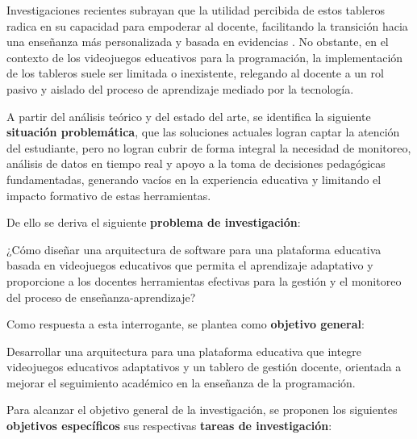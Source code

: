 Investigaciones recientes subrayan que la utilidad percibida de estos tableros radica en su capacidad para empoderar al docente, facilitando la transición hacia una enseñanza más personalizada y basada en evidencias \cite{rets_exploring_2021, ilearn2023dashboards}. No obstante, en el contexto de los videojuegos educativos para la programación, la implementación de los tableros suele ser limitada o inexistente, relegando al docente a un rol pasivo y aislado del proceso de aprendizaje mediado por la tecnología.

A partir del análisis teórico y del estado del arte, se identifica la siguiente \textbf{situación problemática}, que las soluciones actuales logran captar la atención del estudiante, pero no logran cubrir de forma integral la necesidad de monitoreo, análisis de datos en tiempo real y apoyo a la toma de decisiones pedagógicas fundamentadas, generando vacíos en la experiencia educativa y limitando el impacto formativo de estas herramientas.

De ello se deriva el siguiente \textbf{problema de investigación}:

¿Cómo diseñar una arquitectura de software para una plataforma educativa basada en videojuegos educativos que permita el aprendizaje adaptativo y proporcione a los docentes herramientas efectivas para la gestión y el monitoreo del proceso de enseñanza-aprendizaje?

Como respuesta a esta interrogante, se plantea como \textbf{objetivo general}:

Desarrollar una arquitectura para una plataforma educativa que integre videojuegos educativos adaptativos y un tablero de gestión docente, orientada a mejorar el seguimiento académico en la enseñanza de la programación.

Para alcanzar el objetivo general de la investigación, se proponen los siguientes \textbf{objetivos específicos} sus respectivas \textbf{tareas de investigación}:

